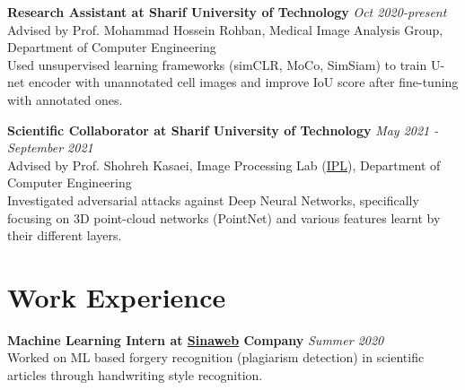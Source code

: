\documentclass[11pt,line,margin]{resume}
\begin{document}
\begin{resume}
\begin{list1}
\item[] \textbf{Research Assistant at Sharif University of Technology} \hfill \textit{Oct 2020-present}\\
\quad Advised by  Prof. Mohammad Hossein Rohban, Medical Image Analysis Group, Department of Computer Engineering \\
Used unsupervised learning frameworks (simCLR, MoCo, SimSiam) to train U-net encoder with unannotated cell images and improve IoU score after fine-tuning with annotated ones.\\

\item[] \textbf{Scientific Collaborator at Sharif University of Technology} \hfill\textit{May 2021 - September 2021}\\
\quad Advised by Prof. Shohreh Kasaei, Image Processing Lab (\href{http://ipl.ce.sharif.edu/}{IPL}), Department of Computer Engineering\\
Investigated adversarial attacks against Deep Neural Networks, specifically focusing on 3D point-cloud networks (PointNet) and various features learnt by their different layers.
\end{list1}

\vspace{-0.14in}
\section{\sc Work Experience}
\begin{list1}
\item[] \textbf{Machine Learning Intern at  \href{https://sinaweb.net}{Sinaweb} Company} \hfill\textit{Summer 2020}\\
Worked on ML based forgery recognition (plagiarism  detection) in scientific articles through handwriting style recognition. \\
\end{list1}


\vspace{-0.2in}

\end{resume}
\end{document}
